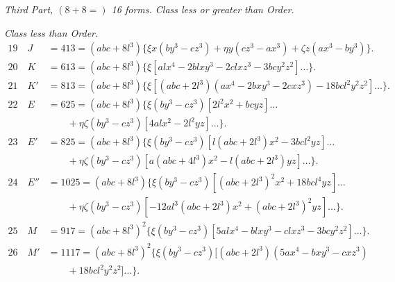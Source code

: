 \documentclass[11pt,a4paper]{article}
\begin{document}
\noindent
\textit{Third Part, $(8+8=)$ 16 forms. Class less or greater than Order.}\par\medskip
\noindent\textit{Class less than Order.}
\begin{align*}
  19\quad J &= 413 = (abc+8l^{3})\{\xi x(by^{3}-cz^{3})+\eta y(cz^{3}-ax^{3})+\zeta z(ax^{3}-by^{3})\}.\\
  20\quad K &= 613 = (abc+8l^{3})\{\xi[al x^{4}-2bl xy^{3}-2cl xz^{3}-3bc y^{2}z^{2}]\ldots\}.\\
  21\quad K' &= 813 = (abc+8l^{3})\{\xi[(abc+2l^{3})(ax^{4}-2bxy^{3}-2cxz^{3})-18bcl^{2}y^{2}z^{2}]\ldots\}.\\
  22\quad E &= 625 = (abc+8l^{3})\{\xi(by^{3}-cz^{3})[2l^{2}x^{2}+bcyz]\ldots\\
   &\qquad +\eta\zeta(by^{3}-cz^{3})[4alx^{2}-2l^{2}yz]\ldots\}.\\
  23\quad E' &= 825 = (abc+8l^{3})\{\xi(by^{3}-cz^{3})[l(abc+2l^{3})x^{2}-3bcl^{2}yz]\ldots\\
   &\qquad +\eta\zeta(by^{3}-cz^{3})[a(abc+4l^{3})x^{2}-l(abc+2l^{3})yz]\ldots\}.\\
  24\quad E'' &= 1025 = (abc+8l^{3})\{\xi(by^{3}-cz^{3})[(abc+2l^{3})^{2}x^{2}+18bcl^{4}yz]\ldots\\
   &\qquad +\eta\zeta(by^{3}-cz^{3})[-12al^{3}(abc+2l^{3})x^{2}+(abc+2l^{3})^{2}yz]\ldots\}.\\
  25\quad M &= 917 = (abc+8l^{3})^{2}\{\xi(by^{3}-cz^{3})[5alx^{4}-blxy^{3}-clxz^{3}-3bcy^{2}z^{2}]\ldots\}.\\
  26\quad M' &= 1117 = (abc+8l^{3})^{2}\{\xi(by^{3}-cz^{3})[(abc+2l^{3})(5ax^{4}-bxy^{3}-cxz^{3})\\
   &\qquad +18bcl^{2}y^{2}z^{2}]\ldots\}.
\end{align*}
\end{document}
